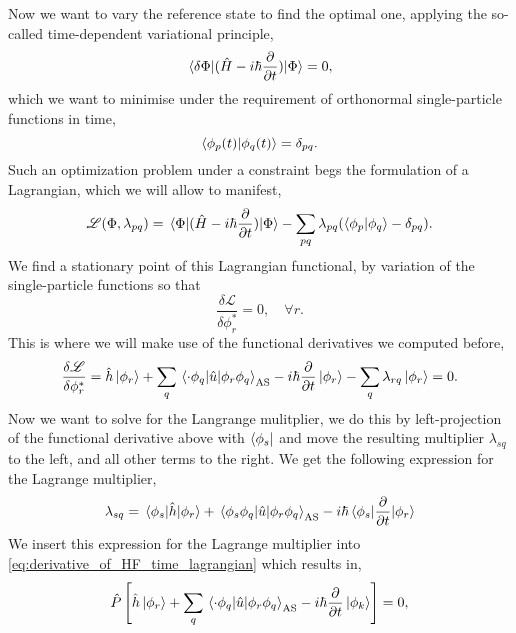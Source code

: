 Now we want to vary the reference state to find the optimal one, 
applying the so-called time-dependent variational principle\cite{dirac1930principles},
\begin{equation}
    \mel{\delta\Phi}{(\hat{H} - i\hbar\frac{\partial}{\partial t})}{\Phi} = 0,
\end{equation}
which we want to minimise under the requirement of orthonormal single-particle functions
in time,
\begin{equation}
    \braket{\phi_p(t)}{\phi_q(t)} = \delta_{pq}.
\end{equation}
Such an optimization problem under a constraint begs the formulation of a Lagrangian,
which we will allow to manifest,
\begin{equation}
    \mathscr{L}(\Phi, \lambda_{pq}) = 
        \mel{\Phi}{(\hat{H} - i\hbar\frac{\partial}{\partial t})}{\Phi}
        - \sum_{pq} \lambda_{pq} (\braket{\phi_p}{\phi_q} - \delta_{pq}).
\end{equation}
We find a stationary point of this Lagrangian functional, by variation of the single-particle 
functions so that 
\begin{equation}
    \frac{\delta\mathscr{L}}{\delta \phi_r^*} = 0, \quad \forall r.
\end{equation}
This is where we will make use of the functional derivatives we computed before,
\begin{equation}
    \label{eq:derivative_of_HF_time_lagrangian}
    \frac{\delta\mathscr{L}}{\delta \phi_r^*}
    = \hat{h}\ket{\phi_r} 
        + \sum_q\mel{\cdot\phi_q}{\hat{u}}{\phi_r\phi_q}_\text{AS}
        - i\hbar\frac{\partial}{\partial t} \ket{\phi_r}
        - \sum_q \lambda_{rq} \ket{\phi_r} = 0.
\end{equation}
Now we want to solve for the Langrange mulitplier, we do this by left-projection of the 
functional derivative above with $\bra{\phi_s}$ and move the resulting multiplier $\lambda_{sq}$
to the left, and all other terms to the right. We 
get the following expression for the Lagrange multiplier,
\begin{equation}
    \lambda_{sq} = \mel{\phi_s}{\hat{h}}{\phi_r} 
        + \mel{\phi_s\phi_q}{\hat{u}}{\phi_r\phi_q}_\text{AS}
        - i\hbar \mel{\phi_s}{\frac{\partial}{\partial t}}{\phi_r}
\end{equation}
We insert this expression for the Lagrange multiplier into \autoref{eq:derivative_of_HF_time_lagrangian}
which results in,
\begin{equation}
    \label{eq:projected_time_hf_eqn}
    \hat{P}\left[\hat{h}\ket{\phi_r}
        + \sum_q\mel{\cdot\phi_q}{\hat{u}}{\phi_r\phi_q}_\text{AS}
        - i\hbar\frac{\partial}{\partial t} \ket{\phi_k}\right] = 0,
\end{equation}
